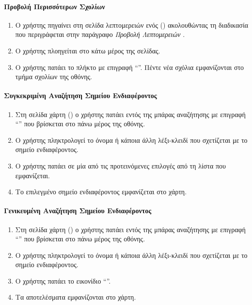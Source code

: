 \paragraph{Προβολή Περισσότερων Σχολίων}
\begin{enumerate}
    \item Ο χρήστης πηγαίνει στη σελίδα λεπτομερειών ενός  (\textit{}) ακολουθώντας τη διαδικασία που περιγράφεται στην παράγραφο \textit{Προβολή Λεπτομερειών }.
    \item Ο χρήστης πλοηγείται στο κάτω μέρος της σελίδας.
    \item Ο χρήστης πατάει το πλήκτο με επιγραφή ``''. Πέντε νέα σχόλια εμφανίζονται στο τμήμα σχολίων της οθόνης.
\end{enumerate}

\paragraph{Συγκεκριμένη Αναζήτηση Σημείου Ενδιαφέροντος}
\begin{enumerate}
    \item Στη σελίδα χάρτη (\textit{}) ο χρήστης πατάει εντός της μπάρας αναζήτησης με επιγραφή ``'' που βρίσκεται στο πάνω μέρος της οθόνης.
    \item Ο χρήστης πληκτρολογεί το όνομα ή κάποια άλλη λέξι-κλειδί που σχετίζεται με το σημείο ενδιαφέροντος.
    \item Ο χρήστης πατάει σε μία από τις προτεινόμενες επιλογές από τη λίστα που εμφανίζεται.
    \item Το επιλεγμένο σημείο ενδιαφέροντος εμφανίζεται στο χάρτη.
\end{enumerate}

\paragraph{Γενικευμένη Αναζήτηση Σημείου Ενδιαφέροντος}
\begin{enumerate}
    \item Στη σελίδα χάρτη (\textit{}) ο χρήστης πατάει εντός της μπάρας αναζήτησης με επιγραφή ``'' που βρίσκεται στο πάνω μέρος της οθόνης.
    \item Ο χρήστης πληκτρολογεί το όνομα ή κάποια άλλη λέξι-κλειδί που σχετίζεται με το σημείο ενδιαφέροντος.
    \item Ο χρήστης πατάει το εικονίδιο ``''.
    \item Τα αποτελέσματα εμφανίζονται στο χάρτη.
\end{enumerate}

